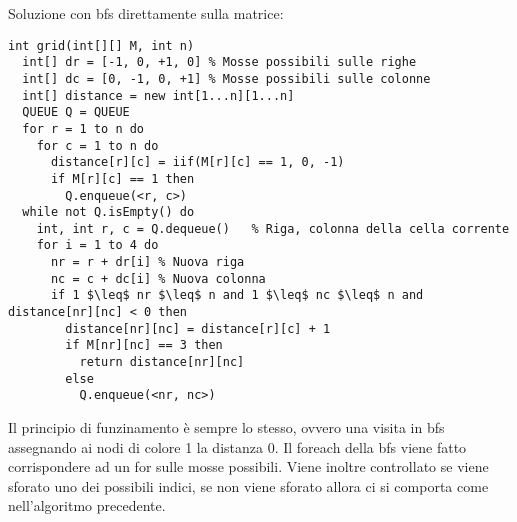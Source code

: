 \documentclass[../cheatSheetAlgoritmi.tex]{subfiles}
\begin{document}
\bigskip

Soluzione con bfs direttamente sulla matrice:
\begin{lstlisting}[caption=Griglia quadra]
int grid(int[][] M, int n)
  int[] dr = [-1, 0, +1, 0] % Mosse possibili sulle righe
  int[] dc = [0, -1, 0, +1] % Mosse possibili sulle colonne
  int[] distance = new int[1...n][1...n]
  QUEUE Q = QUEUE
  for r = 1 to n do
    for c = 1 to n do
      distance[r][c] = iif(M[r][c] == 1, 0, -1)
      if M[r][c] == 1 then
        Q.enqueue(<r, c>)
  while not Q.isEmpty() do
    int, int r, c = Q.dequeue()   % Riga, colonna della cella corrente
    for i = 1 to 4 do
      nr = r + dr[i] % Nuova riga
      nc = c + dc[i] % Nuova colonna
      if 1 $\leq$ nr $\leq$ n and 1 $\leq$ nc $\leq$ n and distance[nr][nc] < 0 then
        distance[nr][nc] = distance[r][c] + 1
        if M[nr][nc] == 3 then
          return distance[nr][nc]
        else
          Q.enqueue(<nr, nc>)
\end{lstlisting}
Il principio di funzinamento è sempre lo stesso, ovvero una visita in bfs assegnando ai nodi di colore 1 la distanza 0. Il foreach della bfs viene fatto corrispondere ad un for sulle mosse possibili. Viene inoltre controllato se viene sforato uno dei possibili indici, se non viene sforato allora ci si comporta come nell'algoritmo precedente.
\end{document}
